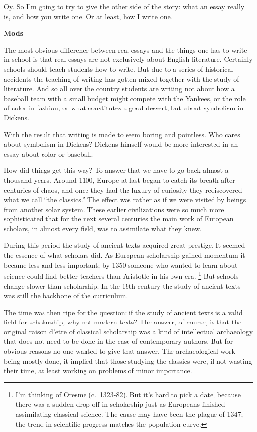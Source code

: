 \documentclass[12pt]{book}
\begin{document}
Oy. So I'm going to try to give the other side of the story: what an
essay really is, and how you write one. Or at least, how I write one.

\textbf{Mods}

The most obvious difference between real essays and the things one has
to write in school is that real essays are not exclusively about English
literature. Certainly schools should teach students how to write. But
due to a series of historical accidents the teaching of writing has
gotten mixed together with the study of literature. And so all over the
country students are writing not about how a baseball team with a small
budget might compete with the Yankees, or the role of color in fashion,
or what constitutes a good dessert, but about symbolism in Dickens.

With the result that writing is made to seem boring and pointless. Who
cares about symbolism in Dickens? Dickens himself would be more
interested in an essay about color or baseball.

How did things get this way? To answer that we have to go back almost a
thousand years. Around 1100, Europe at last began to catch its breath
after centuries of chaos, and once they had the luxury of curiosity they
rediscovered what we call ``the classics.'' The effect was rather as if
we were visited by beings from another solar system. These earlier
civilizations were so much more sophisticated that for the next several
centuries the main work of European scholars, in almost every field, was
to assimilate what they knew.

During this period the study of ancient texts acquired great prestige.
It seemed the essence of what scholars did. As European scholarship
gained momentum it became less and less important; by 1350 someone who
wanted to learn about science could find better teachers than Aristotle
in his own era. \footnote{I'm thinking of Oresme (c.~1323-82). But it's hard to pick a
date, because there was a sudden drop-off in scholarship just as
Europeans finished assimilating classical science. The cause may have
been the plague of 1347; the trend in scientific progress matches the
population curve.} But schools change slower than scholarship. In
the 19th century the study of ancient texts was still the backbone of
the curriculum.

The time was then ripe for the question: if the study of ancient texts
is a valid field for scholarship, why not modern texts? The answer, of
course, is that the original raison d'etre of classical scholarship was
a kind of intellectual archaeology that does not need to be done in the
case of contemporary authors. But for obvious reasons no one wanted to
give that answer. The archaeological work being mostly done, it implied
that those studying the classics were, if not wasting their time, at
least working on problems of minor importance.
\end{document}
